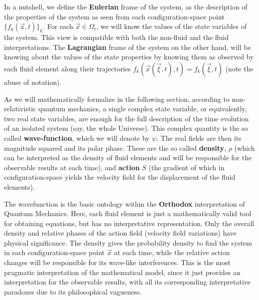 \documentclass[11pt, a4paper]{article} %
\begin{document}
In a nutshell, we define the {\bf Eulerian} frame of the system, as the description of the properties of the system as seen from each configuration-space point $\{f_k(\vec{x},t)\}_k$. For each $\vec{x}\in\Omega_t$, we will know the values of the state variables of the system. This view is compatible with both the non-fluid and the fluid interpretations. The {\bf Lagrangian} frame of the system on the other hand, will be knowing about the values of the state properties by knowing them as observed by each fluid element along their trajectories $f_k(\vec{x}(\vec{\xi},t),t)=f_k(\vec{\xi},t)$ (note the abuse of notation). 
 
As we will mathematically formalize in the following section, according to non-relativistic quantum mechanics, a single complex state variable, or equivalently, two real state variables, are enough for the full description of the time evolution of an isolated system (say, the whole Universe). This complex quantity is the so called {\bf wave-function}, which we will denote by $\psi$. The real fields are then its magnitude squared and its polar phase. These are the so called {\bf density}, $\rho$ (which can be interpreted as the density of fluid elements and will be responsible for the observable results at each time), and {\bf action} $S$ (the gradient of which in configuration-space yields the velocity field for the displacement of the fluid elements).

The wavefunction is the basic ontology within the {\bf Orthodox} interpretation of Quantum Mechanics. Here, each fluid element is just a mathematically valid tool for obtaining equations, but has no interpretative representation. Only the overall density and relative phases of the action field (velocity field variations) have physical significance. The density gives the probability density to find the system in each configuration-space point $\vec{x}$ at each time, while the relative action changes will be responsible for its wave-like interferences. This is the most pragmatic interpretation of the mathematical model, since it just provides an interpretation for the observable results, with all its corresponding interpretative paradoxes due to its philosophical vagueness. 
\end{document}
